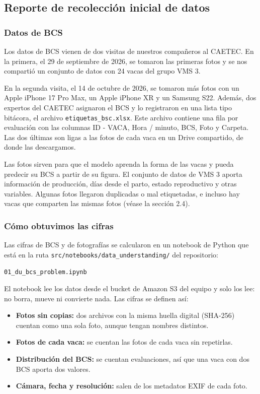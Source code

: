 \subsection{Reporte de recolección inicial de datos}

\subsubsection*{Datos de BCS}

Los datos de BCS vienen de dos visitas de nuestros compañeros al CAETEC. En la primera, el 29 de septiembre de 2026, se tomaron las primeras fotos y se nos compartió un conjunto de datos con 24 vacas del grupo VMS 3.

En la segunda visita, el 14 de octubre de 2026, se tomaron más fotos con un Apple iPhone 17 Pro Max, un Apple iPhone XR y un Samsung S22. Además, dos expertos del CAETEC asignaron el BCS y lo registraron en una lista tipo bitácora, el archivo \texttt{etiquetas\_bsc.xlsx}. Este archivo contiene una fila por evaluación con las columnas ID - VACA, Hora / minuto, BCS, Foto y Carpeta. Las dos últimas son ligas a las fotos de cada vaca en un Drive compartido, de donde las descargamos.

Las fotos sirven para que el modelo aprenda la forma de las vacas y pueda predecir su BCS a partir de su figura. El conjunto de datos de VMS 3 aporta información de producción, días desde el parto, estado reproductivo y otras variables. Algunas fotos llegaron duplicadas o mal etiquetadas, e incluso hay vacas que comparten las mismas fotos (véase la sección 2.4).

\subsubsection*{Cómo obtuvimos las cifras}

Las cifras de BCS y de fotografías se calcularon en un notebook de Python que está en la ruta \nolinkurl{src/notebooks/data_understanding/} del repositorio:

\begin{center}
  \nolinkurl{01_du_bcs_problem.ipynb}
\end{center}

El notebook lee los datos desde el bucket de Amazon S3 del equipo y solo los lee: no borra, mueve ni convierte nada. Las cifras se definen así:

\begin{itemize}
  \item \textbf{Fotos sin copias:} dos archivos con la misma huella digital (SHA-256) cuentan como una sola foto, aunque tengan nombres distintos.
  \item \textbf{Fotos de cada vaca:} se cuentan las fotos de cada vaca sin repetirlas.
  \item \textbf{Distribución del BCS:} se cuentan evaluaciones, así que una vaca con dos BCS aporta dos valores.
  \item \textbf{Cámara, fecha y resolución:} salen de los metadatos EXIF de cada foto.
\end{itemize}

